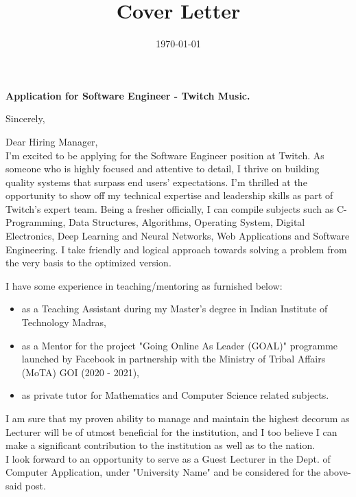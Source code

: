 \documentclass[11pt,a4paper,roman]{moderncv}
\title{\companyName{} Cover Letter}
\newcommand{\companyName}{Twitch}
\newcommand{\companyDivision}{Twitch Music}
\newcommand{\positionName}{Software Engineer}
\begin{document}
\date{\today}
\opening{\textbf{Application for \positionName{} - \companyDivision.}}
\closing{Sincerely, \vspace{-1em}}



\makelettertitle



Dear Hiring Manager,
\\
\vspace{1em}
I'm excited to be applying for the Software Engineer position at \companyName. As someone who is highly focused and attentive to detail, 
I thrive on building quality systems that surpass end users' expectations. 
I'm thrilled at the opportunity to show off my technical expertise and leadership skills as part of \companyName's expert team.
\vspace{1em}
Being a fresher officially, I can compile subjects such as C-Programming, Data Structures, Algorithms, Operating System, Digital Electronics, Deep Learning and Neural Networks, Web Applications and Software Engineering. I take friendly and logical approach towards solving a problem from the very basis to the optimized version.  \\
\vspace{1em}

I have some experience in teaching/mentoring  as furnished below:
\vspace{0.5em}
\begin{itemize}
\item as a Teaching Assistant during my Master's degree in Indian Institute of Technology Madras,
\item as a Mentor for the project "Going Online As Leader (GOAL)" programme launched by Facebook in partnership with the Ministry of Tribal Affairs (MoTA) GOI (2020 - 2021),
\item as private tutor for Mathematics and Computer Science related subjects.
\end{itemize}

\vspace{1em}
I am sure that my proven ability to manage and maintain the highest decorum as Lecturer will be of utmost beneficial for the institution, and I too believe I can make a significant contribution to the institution as well as to the nation. \\

\vspace{1em}
I look forward to an opportunity to serve as a Guest Lecturer in the Dept. of Computer Application, under "University Name" and be considered for the above-said post.

\vspace{0.5cm}


\makeletterclosing
\end{document}
